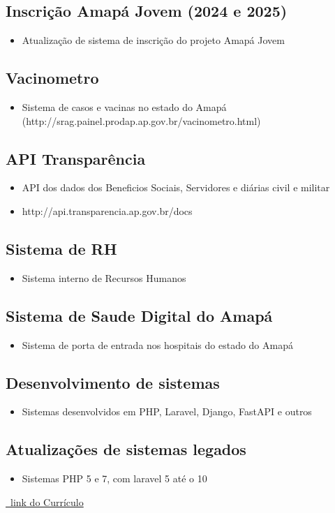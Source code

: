 \documentclass{article}
\begin{document}
\subsection{Inscrição Amapá Jovem (2024 e 2025)}
\begin{itemize}
  \item Atualização de sistema de inscrição do projeto Amapá Jovem
\end{itemize}

\subsection{Vacinometro}
\begin{itemize}
  \item Sistema de casos e vacinas no estado do Amapá (http://srag.painel.prodap.ap.gov.br/vacinometro.html)
\end{itemize}

\subsection{API Transparência}
\begin{itemize}
  \item API dos dados dos Beneficios Sociais, Servidores e diárias civil e militar
  \item http://api.transparencia.ap.gov.br/docs
\end{itemize}

\subsection{Sistema de RH}
\begin{itemize}
  \item Sistema interno de Recursos Humanos
\end{itemize}

\subsection{Sistema de Saude Digital do Amapá}
\begin{itemize}
  \item Sistema de porta de entrada nos hospitais do estado do Amapá
\end{itemize}

\subsection{Desenvolvimento de sistemas}
\begin{itemize}
  \item Sistemas desenvolvidos em PHP, Laravel, Django, FastAPI e outros 
\end{itemize}

\subsection{Atualizações de sistemas legados}
\begin{itemize}
  \item Sistemas PHP 5 e 7, com laravel 5 até o 10
\end{itemize}




\href{https://github.com/PedroPaulo-98/Curriculo}{\faGithub\ link do Currículo}
\end{document}
